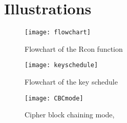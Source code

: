\chapter*{Illustrations} \label{app:fig}

\begin{figure}
  \begin{center}
    \texttt{[image: flowchart]}
  \end{center}
  \caption{Flowchart of the Rcon function}
  \label{img:rcon}
\end{figure}

\begin{figure}
  \texttt{[image: keyschedule]}
  \caption{Flowchart of the key schedule}
  \label{img:keysch}
\end{figure}

\begin{figure}
  \begin{center}
   \texttt{[image: CBCmode]}
  \end{center}
  \caption{Cipher block chaining mode, \citep{CBCmode:2014}}
  \label{img:CBCmode}
\end{figure}


